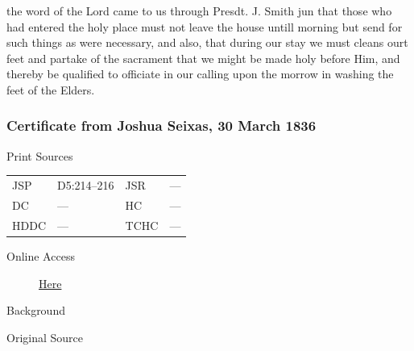 					the word of the Lord came to us through Presdt. J. Smith jun that those who had entered the holy place must not leave the house untill morning but send for such things as were necessary, and also, that during our stay we must cleans ourt feet and partake of the sacrament that we might be made holy before Him, and thereby be qualified to officiate in our calling upon the morrow in washing the feet of the Elders.
					
		\subsubsection{Certificate from Joshua Seixas, 30 March 1836}
			\label{EMS-1836-JS-30-MAR-1836}
			
			\begin{description}
					\item[Print Sources]
				\end{description}

					\begin{tabular}{p{0.5in}p{1in}p{0.5in}p{1in}}
					JSP	 	& D5:214--216		& JSR 		& --- \\
					DC	 	& ---				& HC 		& --- \\
					HDDC 	& ---				& TCHC 		& --- \\
					\end{tabular}
				
				\begin{description}
					\item[Online Access] \href{https://www.josephsmithpapers.org/paper-summary/certificate-from-joshua-seixas-30-march-1836/1}{Here}
				\end{description}
				
				\begin{description}
					\item[Background]
				\end{description}
				
				
				\begin{description}
					\item[Original Source]
				\end{description}
				
